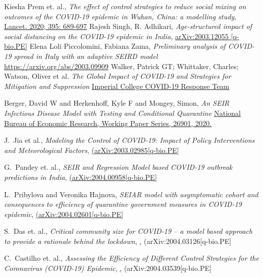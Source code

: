 \documentclass[aps,prd,10pt,twocolumn,nofootinbib]{revtex4-2}
\begin{document}
\begin{thebibliography}{99}
Kiesha Prem et. al., 
{\it The effect of control strategies to reduce social mixing on outcomes of the COVID-19 epidemic in Wuhan, China: a modelling study}, \href{https://doi.org/10.1016/S2468-2667(20)30073-6}
{Lancet. 2020; 395: 689-697} 
Rajesh Singh, R. Adhikari, {\it Age-structured impact of social distancing on the COVID-19 epidemic in India},
\href{https://arxiv.org/abs/2003.12055}{arXiv:2003.12055 [q-bio.PE]}
Elena Loli Piccolomini, Fabiana Zama,
{\it Preliminary analysis of COVID-19 spread in Italy with an adaptive SEIRD model}
\href{https://arxiv.org/abs/2003.09909}{https://arxiv.org/abs/2003.09909}
Walker, Patrick GT; Whittaker, Charles; Watson, Oliver et al.
{\it The Global Impact of COVID-19 and Strategies for Mitigation and Suppression}
\href{https://www.imperial.ac.uk/media/imperial-college/medicine/sph/ide/gida-fellowships/Imperial-College-COVID19-Global-Impact-26-03-2020v2.pdf}{Imperial College COVID-19 Response Team}

Berger, David W and Herkenhoff, Kyle F and Mongey, Simon,
{\it An SEIR Infectious Disease Model with Testing and Conditional Quarantine}
\href{http://www.nber.org/papers/w26901}{National Bureau of Economic Research, Working Paper Series, 26901, 2020.}

J.~Jia et al., {\it Modeling the Control of COVID-19: Impact of Policy Interventions and Meteorological Factors},  \href{https://arxiv.org/abs/2003.02985}{(arXiv:2003.02985[q-bio.PE]}

G.~Pandey et. al., {\it SEIR and Regression Model based COVID-19 outbreak predictions in India}, \href{https://arxiv.org/abs/2004.00958} {(arXiv:2004.00958[q-bio.PE]}

L.~Pribylova and Veronika Hajnova, {\it SEIAR model with asymptomatic cohort and consequences to efficiency of quarantine government measures in COVID-19 epidemic}, \href{https://arxiv.org/abs/2004.02601} {(arXiv:2004.02601[q-bio.PE]}

S.~Das et. al., {\it Critical community size for COVID-19 -- a model based approach to provide a rationale behind the lockdown}, \href{https://arxiv.org/abs/2004.03126}, {(arXiv:2004.03126[q-bio.PE]}

C.~Castilho et. al., {\it Assessing the Efficiency of Different Control Strategies for the Coronavirus (COVID-19) Epidemic}, \href{https://arxiv.org/abs/2004.03539}, {(arXiv:2004.03539[q-bio.PE]}


\end{thebibliography}
\end{document}
